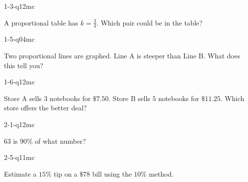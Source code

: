 
\begin{practiceQuestion}{1-3-q12}{mc}
\begin{questionText}
A proportional table has $k = \frac{3}{4}$. Which pair could be in the table?
\end{questionText}
\end{practiceQuestion}

\begin{practiceQuestion}{1-5-q04}{mc}
\begin{questionText}
Two proportional lines are graphed. Line A is steeper than Line B. What does this tell you?
\end{questionText}
\end{practiceQuestion}

\begin{practiceQuestion}{1-6-q12}{mc}
\begin{questionText}
Store A sells $3$ notebooks for $\$7.50$. Store B sells $5$ notebooks for $\$11.25$. Which store offers the better deal?
\end{questionText}
\end{practiceQuestion}

\begin{practiceQuestion}{2-1-q12}{mc}
\begin{questionText}
$63$ is $90\%$ of what number?
\end{questionText}
\end{practiceQuestion}

\begin{practiceQuestion}{2-5-q11}{mc}
\begin{questionText}
Estimate a $15\%$ tip on a $\$78$ bill using the $10\%$ method.
\end{questionText}
\end{practiceQuestion}

